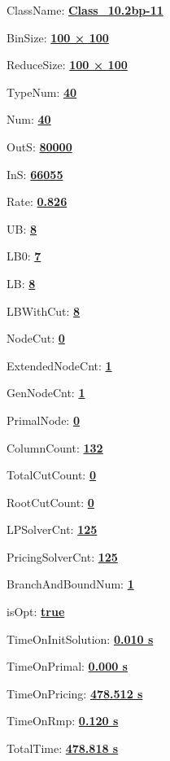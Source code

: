 \documentclass[11pt]{article}
\begin{document}
\pagestyle{empty}


ClassName: \underline{\textbf{Class_10.2bp-11}}
\par
BinSize: \underline{\textbf{100 × 100}}
\par
ReduceSize: \underline{\textbf{100 × 100}}
\par
TypeNum: \underline{\textbf{40}}
\par
Num: \underline{\textbf{40}}
\par
OutS: \underline{\textbf{80000}}
\par
InS: \underline{\textbf{66055}}
\par
Rate: \underline{\textbf{0.826}}
\par
UB: \underline{\textbf{8}}
\par
LB0: \underline{\textbf{7}}
\par
LB: \underline{\textbf{8}}
\par
LBWithCut: \underline{\textbf{8}}
\par
NodeCut: \underline{\textbf{0}}
\par
ExtendedNodeCnt: \underline{\textbf{1}}
\par
GenNodeCnt: \underline{\textbf{1}}
\par
PrimalNode: \underline{\textbf{0}}
\par
ColumnCount: \underline{\textbf{132}}
\par
TotalCutCount: \underline{\textbf{0}}
\par
RootCutCount: \underline{\textbf{0}}
\par
LPSolverCnt: \underline{\textbf{125}}
\par
PricingSolverCnt: \underline{\textbf{125}}
\par
BranchAndBoundNum: \underline{\textbf{1}}
\par
isOpt: \underline{\textbf{true}}
\par
TimeOnInitSolution: \underline{\textbf{0.010 s}}
\par
TimeOnPrimal: \underline{\textbf{0.000 s}}
\par
TimeOnPricing: \underline{\textbf{478.512 s}}
\par
TimeOnRmp: \underline{\textbf{0.120 s}}
\par
TotalTime: \underline{\textbf{478.818 s}}
\par
\newpage


\end{document}

